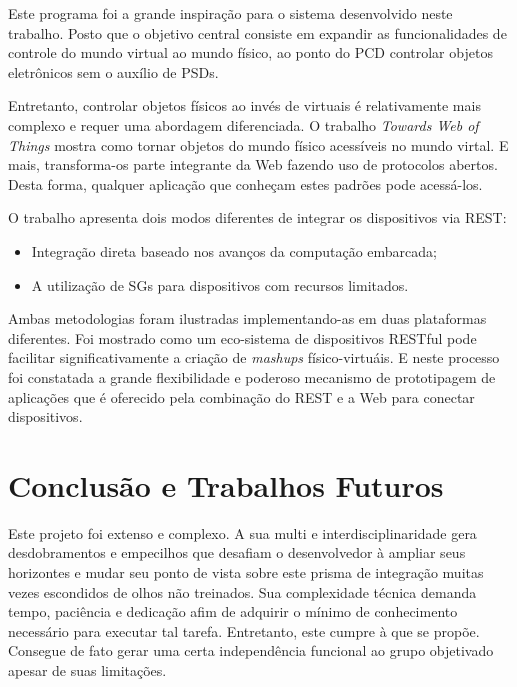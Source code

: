 \documentclass[12pt,a4paper,oneside]{report}
\begin{document}
Este programa foi a grande inspiração para o sistema desenvolvido neste trabalho. Posto que o objetivo central consiste em expandir as funcionalidades de controle do mundo virtual ao mundo físico, ao ponto do PCD controlar objetos eletrônicos sem o auxílio de PSDs.

Entretanto, controlar objetos físicos ao invés de virtuais é relativamente mais complexo e requer uma abordagem diferenciada. O trabalho \emph{Towards Web of Things} \cite{wotdovad} mostra como tornar objetos do mundo físico acessíveis no mundo virtal. E mais, transforma-os parte integrante da Web fazendo uso de protocolos abertos. Desta forma, qualquer aplicação que conheçam estes padrões pode acessá-los.

O trabalho apresenta dois modos diferentes de integrar os dispositivos via REST:
\begin{itemize}
	\item Integração direta baseado nos avanços da computação embarcada;
	\item A utilização de SGs para dispositivos com recursos limitados.
\end{itemize}

Ambas metodologias foram ilustradas implementando-as em duas plataformas diferentes. Foi mostrado como um eco-sistema de dispositivos RESTful pode facilitar significativamente a criação de \emph{mashups} físico-virtuáis. E neste processo foi constatada a grande flexibilidade e poderoso mecanismo de prototipagem de aplicações que é oferecido pela combinação do REST e a Web para conectar dispositivos.


\chapter{Conclusão e Trabalhos Futuros}
\label{chap:conclusao}

Este projeto foi extenso e complexo. A sua multi e interdisciplinaridade gera desdobramentos e empecilhos que desafiam o desenvolvedor à ampliar seus horizontes e mudar seu ponto de vista sobre este prisma de integração muitas vezes escondidos de olhos não treinados. Sua complexidade técnica demanda tempo, paciência e dedicação afim de adquirir o mínimo de conhecimento necessário para executar tal tarefa. Entretanto, este cumpre à que se propõe. Consegue de fato gerar uma certa independência funcional ao grupo objetivado apesar de suas limitações.
\end{document}
